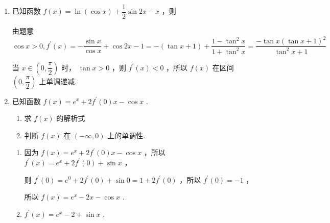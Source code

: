 \begin{enumerate}
\begin{enumerate}
        \item 已知函数 $f\left( x\right)  = \ln \left( {\cos x}\right)  + \dfrac{1}{2}\sin {2x} - x$ ，则
        
        \begin{jieda}
            由题意 $\cos x > 0,{f}^{\prime }\left( x\right)  =  - \dfrac{\sin x}{\cos x} + \cos {2x} - 1 =  - \left( {\tan x + 1}\right)  + \dfrac{1 - {\tan }^{2}x}{1 + {\tan }^{2}x} = \dfrac{-\tan x{\left( \tan x + 1\right) }^{2}}{{\tan }^{2}x + 1}$
            
            当 $x \in  \left( {0,\dfrac{\pi}{2}}\right)$ 时， $\tan x > 0$ ，则 ${f}^{\prime }\left( x\right)  < 0$ ，所以 $f\left( x\right)$ 在区间 $\left( {0,\dfrac{\pi }{2}}\right)$ 上单调递减.
        \end{jieda}
        

        \item 已知函数 $f\left( x\right)  = {{e}}^{x} + 2{f}^{\prime }\left( 0\right) x - \cos x$ .
        \begin{enumerate}
            \item 求 $f\left( x\right)$ 的解析式
            \item 判断 $f\left( x\right)$ 在 $\left( {-\infty ,0}\right)$ 上的单调性.
        \end{enumerate}
        \begin{jieda}
            \begin{enumerate}
                \item 因为 $f\left( x\right)  = {{e}}^{x} + 2{f}^{\prime }\left( 0\right) x - \cos x$ ，所以 ${f}^{\prime }\left( x\right)  = {{e}}^{x} + 2{f}^{\prime }\left( 0\right)  + \sin x$ ，
                
                则 ${f}^{\prime }\left( 0\right)  = {{e}}^{0} + 2{f}^{\prime }\left( 0\right)  + \sin 0 = 1 + 2{f}^{\prime }\left( 0\right)$ ，所以 ${f}^{\prime }\left( 0\right)  =  - 1$ ，
                
                所以 $f\left( x\right)  = {{e}}^{x} - {2x} - \cos x$ .
                \item ${f}^{\prime }\left( x\right)  = {{e}}^{x} - 2 + \sin x$ ,
                

\end{enumerate}
\end{jieda}
\end{enumerate}
\end{enumerate}
